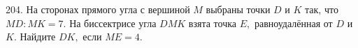 204. На сторонах прямого угла с вершиной $M$ выбраны точки $D$ и $K$ так, что $MD : MK = 7.$ На
биссектрисе угла $DMK$ взята точка $E,$ равноудалённая от $D$ и $K.$ Найдите $DK,$ если $ME = 4.$\\
